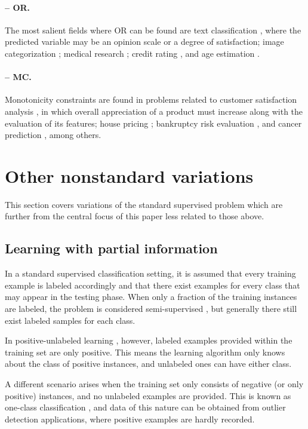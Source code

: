 \documentclass[
	fontsize=11pt, %
	twoside=false, %
	open=any, %
	secnumdepth=1, %
]{kaobook}
\begin{document}
\paragraph{-- OR.} The most salient fields where OR can be found are text classification \cite{aor-text}, where the predicted variable may be an opinion scale or a degree of satisfaction; image categorization \cite{aor-image}; medical research \cite{aor-medical}; credit rating \cite{aor-credit}, and age estimation \cite{aor-age}.

\paragraph{-- MC.} Monotonicity constraints are found in problems related to customer satisfaction analysis \cite{amc-customer}, in which overall appreciation of a product must increase along with the evaluation of its features; house pricing \cite{mc-trees}; bankruptcy risk evaluation \cite{amc-bank}, and cancer prediction \cite{amc-cancer}, among others.

\section{Other nonstandard variations}
\label{sec:othervariations}

This section covers variations of the standard supervised problem which are further from the central focus of this paper less related to those above. 

\subsection{Learning with partial information}
\label{sec:partial}


In a standard supervised classification setting, it is assumed that every training example is labeled accordingly and that there exist examples for every class that may appear in the testing phase. When only a fraction of the training instances are labeled, the problem is considered semi-supervised \cite{semi-sup}, but generally there still exist labeled samples for each class.

In positive-unlabeled learning \cite{pu-learn,pu-text}, however, labeled examples provided within the training set are only positive. This means the learning algorithm only knows about the class of positive instances, and unlabeled ones can have either class. 

A different scenario arises when the training set only consists of negative (or only positive) instances, and no unlabeled examples are provided. This is known as one-class classification \cite{oneclass}, and data of this nature can be obtained from outlier detection applications, where positive examples are hardly recorded.
\end{document}
